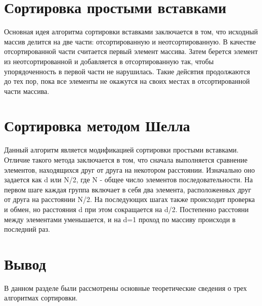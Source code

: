 \section{Сортировка простыми вставками}
Основная идея алгоритма сортировки вставками заключается в том, что исходный массив делится на две части: отсортированную и неотсортированную. В качестве отсортированной части считается первый элемент массива. Затем берется элемент из неотсортированной и добавляется в отсортированную так, чтобы упорядоченность в первой части не нарушилась. Такие дейсвтия продолжаются до тех пор, пока все элементы не окажутся на своих местах в отсортированной части массива.

\section{Сортировка методом Шелла}
Данный алгоритм является модификацией сортировки простыми вставками. Отличие такого метода заключается в том, что сначала выполняется сравнение элементов, находящихся друг от друга на некотором расстоянии. Изначально оно задается как d или N/2, где N - общее число элементов последовательности. На первом шаге каждая группа включает в себя два элемента, расположенных друг от друга на расстоянии N/2. На последующих шагах также происходит проверка и обмен, но расстояния d при этом сокращается на d/2. Постепенно расстояни между элементами уменьшается, и на d=1 проход по массиву происходи в последний раз. 

\section*{Вывод}
В данном разделе были рассмотрены основные теоретические сведения о трех алгоритмах сортировки. 